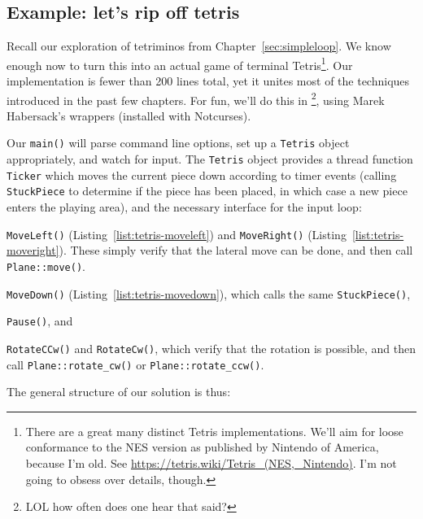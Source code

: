 \subsection{Example: let's rip off tetris}
\label{sec:casestudy}
Recall our exploration of tetriminos from Chapter~\ref{sec:simpleloop}. We
know enough now to turn this into an actual game of terminal Tetris\footnote{There
are a great many distinct Tetris implementations. We'll aim for loose
conformance to the NES version as published by Nintendo of America, because
I'm old. See \url{https://tetris.wiki/Tetris_(NES,_Nintendo)}. I'm not going
to obsess over details, though.}. Our implementation is fewer than 200 lines
total, yet it unites most of the techniques introduced in the past few
chapters. For fun, we'll do this in \CC\footnote{LOL how often does one hear
that said?}, using Marek Habersack's \CC wrappers (installed with Notcurses).

Our \texttt{main()} will parse command line options, set up a \texttt{Tetris}
object appropriately, and watch for input. The \texttt{Tetris} object provides
a thread function \texttt{Ticker} which moves the current piece down according
to timer events (calling \texttt{StuckPiece} to determine if the piece has been
placed, in which case a new piece enters the playing area), and the necessary
interface for the input loop:

\begin{denseitemize}
\item{\texttt{MoveLeft()} (Listing~\ref{list:tetris-moveleft}) and \texttt{MoveRight()}
    (Listing~\ref{list:tetris-moveright}). These simply verify that the lateral
    move can be done, and then call \texttt{Plane::move()}.}
\item{\texttt{MoveDown()} (Listing~\ref{list:tetris-movedown}), which calls the same \texttt{StuckPiece()},}
\item{\texttt{Pause()}, and}
\item{\texttt{RotateCCw()} and \texttt{RotateCw()}, which verify that the rotation
      is possible, and then call \texttt{Plane::rotate\_cw()} or \texttt{Plane::rotate\_ccw()}.}
\end{denseitemize}

The general structure of our solution is thus:

